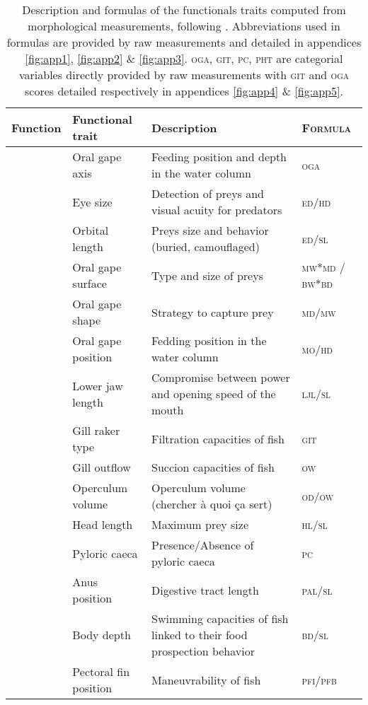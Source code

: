 \begin{sidewaystable}
\centering
\caption{Description and formulas of the functionals traits computed from morphological measurements, following \citep{albouy2011, aneeshkumar2017,boyle2006,brindamour2016,diderich2006,dumay2004,habib2019,ibanez2007,sibbing2000,webb1984,winemiller1991}. Abbreviations used in formulas are provided by raw measurements and detailed in appendices \ref{fig:app1}, \ref{fig:app2} \& \ref{fig:app3}. \textsc{oga}, \textsc{git}, \textsc{pc}, \textsc{pht} are categorial variables directly provided by raw measurements with \textsc{git} and \textsc{oga} scores detailed respectively in appendices \ref{fig:app4} \& \ref{fig:app5}.}
\label{table:functraits}
\begin{tabular}{>{\bfseries}lll>{\scshape}l}
  \hline
Function & Functional trait & Description & Formula  \\ 
  \hline
\multirow{13}{*}{Feeding} &Oral gape axis & Feeding position and depth in the water column & oga \\ 
  &Eye size & Detection of preys and visual acuity for predators & ed/hd \\ 
  &Orbital length & Preys size and behavior (buried, camouflaged) & ed/sl \\ 
  &Oral gape surface & Type and size of preys & mw*md / bw*bd \\ 
  &Oral gape shape & Strategy to capture prey & md/mw \\ 
  &Oral gape position & Fedding position in the water column & mo/hd \\ 
  &Lower jaw length & Compromise between power and opening speed of the mouth & ljl/sl \\ 
  &Gill raker type & Filtration capacities of fish & git \\ 
  &Gill outflow & Succion capacities of fish & ow \\ 
  &Operculum volume & Operculum volume (chercher à quoi ça sert) & od/ow \\ 
  &Head length & Maximum prey size & hl/sl \\ 
  &Pyloric caeca & Presence/Absence of pyloric caeca & pc \\ 
  &Anus position & Digestive tract length & pal/sl \\ 
  \hline
  \multirow{6}{*}{Locomotion} & Body depth & Swimming capacities of fish linked to their food prospection behavior & bd/sl \\ 
  &Pectoral fin position & Maneuvrability of fish & pfi/pfb \\ 

\end{tabular}
\end{sidewaystable}
